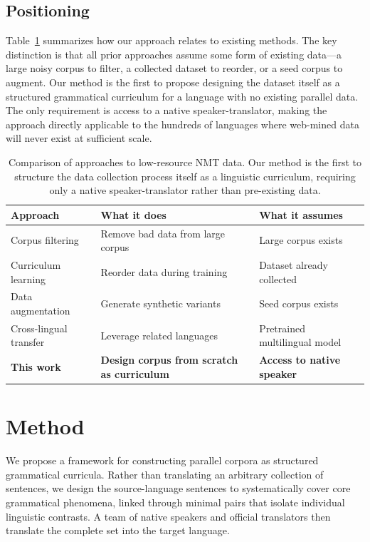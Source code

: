 \documentclass[11pt]{article}
\begin{document}
\subsection{Positioning}

Table~\ref{tab:positioning} summarizes how our approach relates to existing methods. The key distinction is that all prior approaches assume some form of existing data---a large noisy corpus to filter, a collected dataset to reorder, or a seed corpus to augment. Our method is the first to propose designing the dataset itself as a structured grammatical curriculum for a language with no existing parallel data. The only requirement is access to a native speaker-translator, making the approach directly applicable to the hundreds of languages where web-mined data will never exist at sufficient scale.

\begin{table}[t]
\centering
\small
\begin{tabular}{p{2.5cm}p{2.1cm}p{2.1cm}}
\hline
\textbf{Approach} & \textbf{What it does} & \textbf{What it assumes} \\
\hline
Corpus filtering \citep{junczysdowmunt2018dual} & Remove bad data from large corpus & Large corpus exists \\
Curriculum learning \citep{platanios2019competence} & Reorder data during training & Dataset already collected \\
Data augmentation \citep{groshan2025linguistically} & Generate synthetic variants & Seed corpus exists \\
Cross-lingual transfer \citep{nllb2022} & Leverage related languages & Pretrained multilingual model \\
\textbf{This work} & \textbf{Design corpus from scratch as curriculum} & \textbf{Access to native speaker} \\
\hline
\end{tabular}
\caption{Comparison of approaches to low-resource NMT data. Our method is the first to structure the data collection process itself as a linguistic curriculum, requiring only a native speaker-translator rather than pre-existing data.}
\label{tab:positioning}
\end{table}

\section{Method}
\label{sec:method}

We propose a framework for constructing parallel corpora as structured grammatical curricula. Rather than translating an arbitrary collection of sentences, we design the source-language sentences to systematically cover core grammatical phenomena, linked through minimal pairs that isolate individual linguistic contrasts. A team of native speakers and official translators then translate the complete set into the target language.
\end{document}
